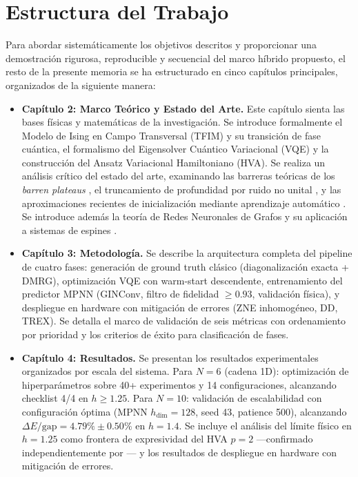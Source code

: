 \documentclass[11pt,a4paper,spanish]{book}
\begin{document}
\section{Estructura del Trabajo}

Para abordar sistemáticamente los objetivos descritos y proporcionar una demostración rigurosa, reproducible y secuencial del marco híbrido propuesto, el resto de la presente memoria se ha estructurado en cinco capítulos principales, organizados de la siguiente manera:

\begin{itemize}
    \item \textbf{Capítulo 2: Marco Teórico y Estado del Arte.} Este capítulo sienta las bases físicas y matemáticas de la investigación. Se introduce formalmente el Modelo de Ising en Campo Transversal (TFIM) y su transición de fase cuántica, el formalismo del Eigensolver Cuántico Variacional (VQE) y la construcción del Ansatz Variacional Hamiltoniano (HVA). Se realiza un análisis crítico del estado del arte, examinando las barreras teóricas de los \emph{barren plateaus} \citep{mcclean2018, cerezo2021}, el truncamiento de profundidad por ruido no unital \citep{mele2026}, y las aproximaciones recientes de inicialización mediante aprendizaje automático \citep{miao2024, zhang2025, zou2026}. Se introduce además la teoría de Redes Neuronales de Grafos y su aplicación a sistemas de espines \citep{xu2019, gilmer2017, kochkov2021}.

    \item \textbf{Capítulo 3: Metodología.} Se describe la arquitectura completa del pipeline de cuatro fases: generación de ground truth clásico (diagonalización exacta + DMRG), optimización VQE con warm-start descendente, entrenamiento del predictor MPNN (GINConv, filtro de fidelidad $\geq 0.93$, validación física), y despliegue en hardware con mitigación de errores (ZNE inhomogéneo, DD, TREX). Se detalla el marco de validación de seis métricas con ordenamiento por prioridad y los criterios de éxito para clasificación de fases.

    \item \textbf{Capítulo 4: Resultados.} Se presentan los resultados experimentales organizados por escala del sistema. Para $N=6$ (cadena 1D): optimización de hiperparámetros sobre 40+ experimentos y 14 configuraciones, alcanzando checklist 4/4 en $h \geq 1.25$. Para $N=10$: validación de escalabilidad con configuración óptima (MPNN $h_{\text{dim}}=128$, seed 43, patience 500), alcanzando $\Delta E/\text{gap} = 4.79\% \pm 0.50\%$ en $h=1.4$. Se incluye el análisis del límite físico en $h=1.25$ como frontera de expresividad del HVA $p=2$ ---confirmado independientemente por \citet{tripathi2026}--- y los resultados de despliegue en hardware con mitigación de errores.


\end{itemize}
\end{document}

